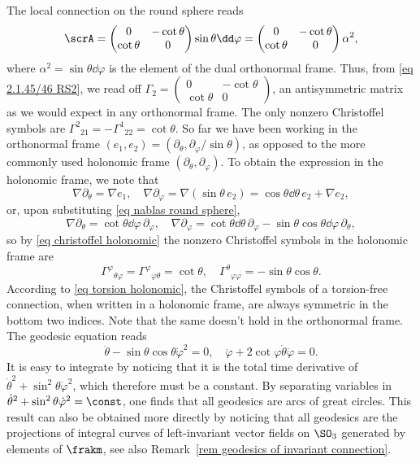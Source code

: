 \begin{example}\label{ex round sphere 4}
    The local connection on the round sphere reads 
    \[\scrA=\begin{pmatrix}
        0 & -\cot\theta\\
        \cot\theta & 0
    \end{pmatrix}\sin\theta\dd\varphi=\begin{pmatrix}
        0 & -\cot\theta\\
        \cot\theta & 0
    \end{pmatrix}\alpha^2,\]
    where $\alpha^2=\sin\theta\dd\varphi$ is the element of the dual orthonormal frame. Thus, from \eqref{eq 2.1.45/46 RS2}, we read off $\varGamma_2=\left(\begin{smallmatrix}
        0 & -\cot\theta\\\cot\theta & 0
    \end{smallmatrix}\right)$, an antisymmetric matrix as we would expect in any orthonormal frame. The only nonzero Christoffel symbols are $\varGamma^2{}_{21}=-\varGamma^1{}_{22}=\cot\theta$. So far we have been working in the orthonormal frame $(e_1,e_2)=(\partial_\theta,\partial_\varphi/\sin\theta)$, as opposed to the more commonly used holonomic frame $(\partial_\theta,\partial_\varphi)$. To obtain the expression in the holonomic frame, we note that 
    \[\nabla\partial_\theta=\nabla e_1,\quad \nabla\partial_\varphi=\nabla(\sin\theta\, e_2)=\cos\theta\dd\theta\, e_2+\nabla e_2,\]
    or, upon substituting \eqref{eq nablas round sphere},
    \[\nabla \partial_\theta=\cot\theta\dd\varphi \, \partial_\varphi,\quad \nabla\partial_\varphi=\cot\theta\dd\theta\, \partial_\varphi-\sin\theta\cos\theta\dd\varphi\,\partial_\theta,\]
    so by \eqref{eq christoffel holonomic} the nonzero Christoffel symbols in the holonomic frame are
    \[\varGamma^\varphi{}_{\theta\varphi}=\varGamma^\varphi{}_{\varphi\theta}=\cot\theta,\quad \varGamma^\theta{}_{\varphi\varphi}=-\sin\theta\cos\theta.\]
    According to \eqref{eq torsion holonomic}, the Christoffel symbols of a torsion-free connection, when written in a holonomic frame, are always symmetric in the bottom two indices. Note that the same doesn't hold in the orthonormal frame. The geodesic equation reads 
    \[\ddot\theta-\sin\theta\cos\theta\dot\varphi^2=0,\quad \ddot\varphi+2\cot\varphi\dot\theta\dot\varphi=0.\]
    It is easy to integrate by noticing that it is the total time derivative of $\dot\theta^2+\sin^2\theta\dot\varphi^2$, which therefore must be a constant. By separating variables in $\dot\theta^2+\sin^2\theta\dot\varphi^2=\const$, one finds that all geodesics are arcs of great circles. This result can also be obtained more directly by noticing that all geodesics are the projections of integral curves of left-invariant vector fields on $\SO_3$ generated by elements of $\frakm$, see also Remark~\ref{rem geodesics of invariant connection}.


\end{example}
